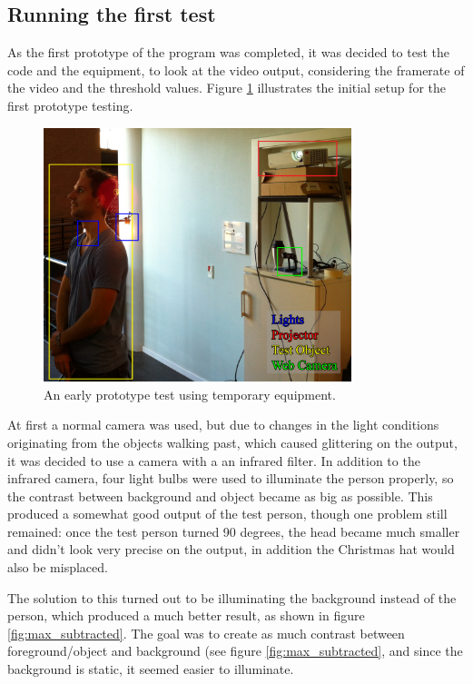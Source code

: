 \subsection{Running the first test}
As the first prototype of the program was completed, it was decided to test the code and the  equipment, to look at the video output, considering the framerate of the video and the threshold values. Figure \ref{fig:ir_cam_test} illustrates the initial setup for the first prototype testing.

\begin{figure}[htbp]
\centering
\includegraphics[width=0.80\textwidth]{Pictures/Test/TestSetup.jpg}
\caption{An early prototype test using temporary equipment.}
\label{fig:ir_cam_test}
\end{figure} 

At first a normal camera was used, but due to changes in the light conditions originating from the objects walking past, which caused glittering on the output, it was decided to use a camera with a an infrared filter. In addition to the infrared camera, four light bulbs were used to illuminate the person properly, so the contrast between background and object became as big as possible. This produced a somewhat good output of the test person, though one problem still remained: once the test person turned 90 degrees, the head became much smaller and didn't look very precise on the output, in addition the Christmas hat would also be misplaced.

The solution to this turned out to be illuminating the background instead of the person, which produced a much better result, as shown in figure \ref{fig:max_subtracted}. The goal was to create as much contrast between foreground/object and background (see figure \ref{fig:max_subtracted}, and since the background is static, it seemed easier to illuminate.

